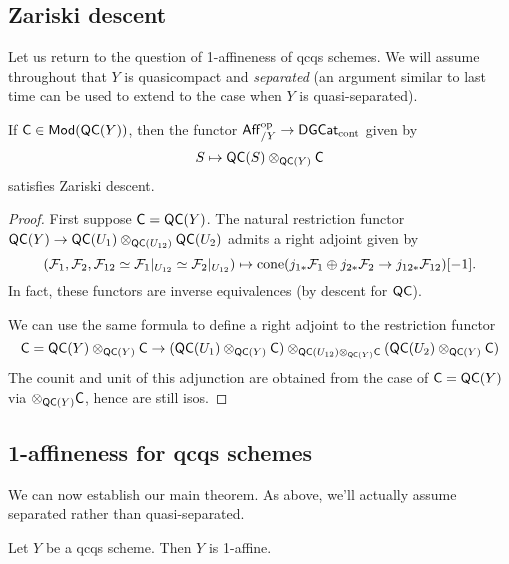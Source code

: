 \documentclass{article}
\begin{document}
\subsection{Zariski descent}

Let us return to the question of 1-affineness of qcqs schemes.
We will assume throughout that $Y$ is quasicompact and \emph{separated} (an argument similar to last time can be used to extend to the case when $Y$ is quasi-separated).

\begin{prop}
	If $\mathsf{C} \in \mathsf{Mod}(\mathsf{QC}(Y))$, then the functor $\mathsf{Aff}_{/Y}^{\mathrm{op}} \to \mathsf{DGCat}_{\mathrm{cont}}$ given by
	\[
		S \mapsto \mathsf{QC}(S) \otimes_{\mathsf{QC}(Y)} \mathsf{C}
	\]
	satisfies Zariski descent.
\end{prop}

\begin{proof}
	First suppose $\mathsf{C} = \mathsf{QC}(Y)$.
	The natural restriction functor $\mathsf{QC}(Y) \to \mathsf{QC}(U_1) \otimes_{\mathsf{QC}(U_{12})} \mathsf{QC}(U_2)$ admits a right adjoint given by
	\[
		(\mathcal{F}_1, \mathcal{F}_2, \mathcal{F}_{12} \simeq \mathcal{F}_1|_{U_{12}} \simeq \mathcal{F}_2|_{U_{12}}) \mapsto \operatorname{cone}(j_{1*} \mathcal{F}_1 \oplus j_{2*} \mathcal{F}_2 \to j_{12*} \mathcal{F}_{12})[-1].
	\]
	In fact, these functors are inverse equivalences (by descent for $\mathsf{QC}$).

	We can use the same formula to define a right adjoint to the restriction functor
	\[
		\mathsf{C} = \mathsf{QC}(Y) \otimes_{\mathsf{QC}(Y)} \mathsf{C} \to (\mathsf{QC}(U_1) \otimes_{\mathsf{QC}(Y)} \mathsf{C}) \otimes_{\mathsf{QC}(U_{12}) \otimes_{\mathsf{QC}(Y)} \mathsf{C}} (\mathsf{QC}(U_2) \otimes_{\mathsf{QC}(Y)} \mathsf{C})
	\]
	The counit and unit of this adjunction are obtained from the case of $\mathsf{C} = \mathsf{QC}(Y)$ via $\otimes_{\mathsf{QC}(Y)} \mathsf{C}$, hence are still isos.
\end{proof}

\subsection{1-affineness for qcqs schemes}

We can now establish our main theorem.
As above, we'll actually assume separated rather than quasi-separated.

\begin{thm}
	Let $Y$ be a qcqs scheme.
	Then $Y$ is 1-affine.
\end{thm}
\end{document}
